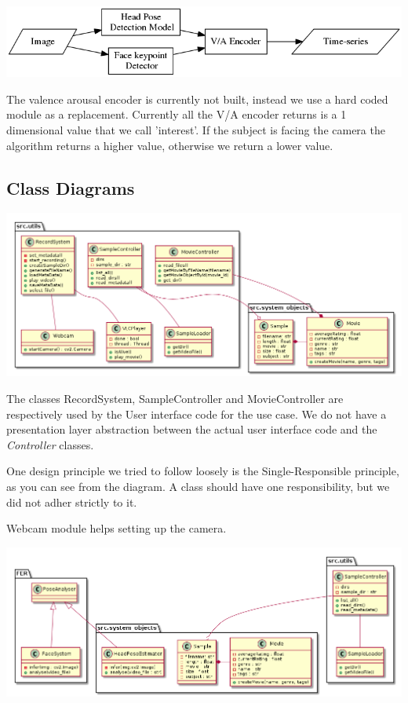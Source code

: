 \documentclass[12pt,a4paper,man]{report}
\begin{document}
\begin{center}
\includegraphics[width=.9\linewidth]{img/begrpipeline.png}
\end{center}

The valence arousal encoder is currently not built, instead we use a hard coded module as a replacement. Currently all the V/A encoder returns is a 1 dimensional value that we call 'interest'. If the subject is facing the camera the algorithm returns a higher value, otherwise we return a lower value.


\subsection{Class Diagrams}
\label{sec:org52e8db1}

\begin{center}
\includegraphics[width=.9\linewidth]{img/class1.png}
\end{center}

The classes RecordSystem, SampleController and MovieController are respectively used by the User interface code for the use case. We do not have a presentation layer abstraction between the actual user interface code and the \emph{Controller} classes.

One design principle we tried to follow loosely is the Single-Responsible principle, as you can see from the diagram. A class should have one responsibility, but we did not adher strictly to it.

Webcam module helps setting up the camera.


\begin{center}
\includegraphics[width=.9\linewidth]{img/class2.png}
\end{center}
\end{document}
